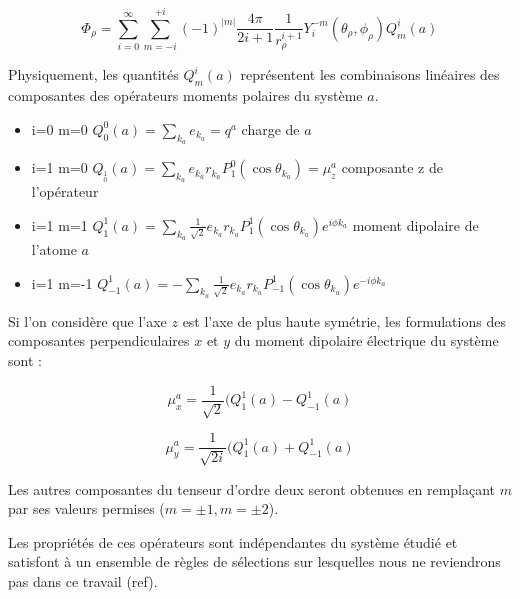 \begin{equation}
\Phi_{\rho} = \sum_{i=0}^{\infty} \sum_{m=-i}^{+i} (-1)^{|m|} \frac{4\pi}{2i +1} \frac{1}{r_{\rho}^{i+1}} Y_{i}^{-m} (\theta_{\rho},\phi_{\rho})Q_{m}^{i}(a)
\end{equation}
	
Physiquement, les quantités $Q_{m}^{i}(a)$ représentent les combinaisons linéaires des composantes des opérateurs moments polaires du système $a$. 
		
\begin{itemize}
	\item i=0 m=0 \hspace{0.9cm} $Q_{0}^{0}(a) = \sum_{k_{a}} e_{k_{a}} = q^{a}$ \hspace{3.5cm} charge de $a$
	\item i=1 m=0 \hspace{0.9cm} $Q_{_{0}^{1}}(a)= \sum_{k_{a}} e_{k_{a}} r_{k_{a}} P^{0}_{1} (\cos\theta_{k_{a}}) = \mu_{z}^{a}$ \hspace{1cm} composante z de l'opérateur	\item i=1 m=1 \hspace{0.9cm} $Q_{1}^{1}(a)= \sum_{k_{a}} \frac{1}{\sqrt{2}}e_{k_{a}} r_{k_{a}} P^{1}_{1} (\cos\theta_{k_{a}}) e^{i\phi k_{a}}$ \hspace{0.6cm} moment dipolaire de l'atome $a$
	\item i=1 m=-1 \hspace{0.9cm} $Q_{-1}^{1}(a) = -\sum_{k_{a}} \frac{1}{\sqrt{2}}e_{k_{a}} r_{k_{a}} P^{1}_{-1} (\cos\theta_{k_{a}}) e^{-i\phi k_{a}}$
\end{itemize}
	
Si l'on considère que l'axe $z$ est l'axe de plus haute symétrie, les formulations des composantes perpendiculaires $x$ et $y$ du moment dipolaire électrique du système sont : 
	
\begin{equation}
\mu_{x}^{a} = \frac{1}{\sqrt{2}} (Q_{1}^{1}(a)- Q_{-1}^{1}(a)
\end{equation}
	
\begin{equation}
\mu_{y}^{a} = \frac{1}{\sqrt{2i}} (Q_{1}^{1}(a)+ Q_{-1}^{1}(a)
\end{equation}

Les autres composantes du tenseur d'ordre deux seront obtenues en remplaçant $m$ par ses valeurs permises ($m=\pm 1, m=\pm 2$).

Les propriétés de ces opérateurs sont indépendantes du système étudié et satisfont à un ensemble de règles de sélections sur lesquelles nous ne reviendrons pas dans ce travail (ref). 
	
